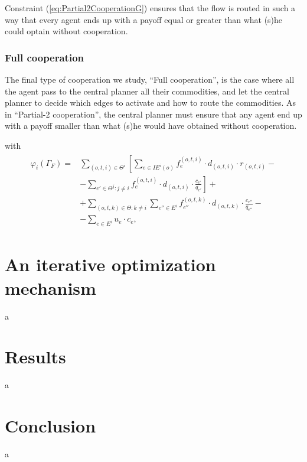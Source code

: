 \documentclass[review]{elsarticle}
\begin{document}
Constraint (\ref{eq:Partial2CooperationG}) ensures that the flow is routed in
such a way that every agent ends up with a payoff equal or greater than what
(s)he could optain without cooperation.

\subsubsection*{Full cooperation}


The final type of cooperation we study, ``Full cooperation'', is the case where
all the agent pass to the central planner all their commodities, and let the
central planner to decide which edges to activate and how to route the
commodities. As in ``Partial-2 cooperation'', the central planner must ensure
that any agent end up with a payoff smaller than what (s)he would have obtained
without cooperation.

with 
    \begin{align}
        \begin{split}
        \varphi_i(\Gamma_F) = & \sum_{(o,t,i)\in \Theta^i} \left[ \sum_{e \in IE^i(o)} f_e^{(o,t,i)} \cdot d_{(o,t,i)} \cdot r_{(o,t,i)} - \right. \\
                              & \left. - \sum_{e'\in \Theta^j \colon j\not = i} f_e^{(o,t,i)} \cdot d_{(o,t,i)} \cdot \frac{c_{e'}}{q_{e'}} \right] + \\
                              & + \sum_{(o,t,k) \in \Theta \colon k \not = i} \sum_{e'' \in E^i} f_{e''}^{(o,t,k)} \cdot d_{(o,t,k)} \cdot \frac{c_{e''}}{q_{e''}} -\\
                              & - \sum_{e \in E^i} u_e \cdot c_e,
        \end{split}
    \end{align}
\section{An iterative optimization mechanism}
a
\section{Results}
a
\section{Conclusion}
a


\end{document}
